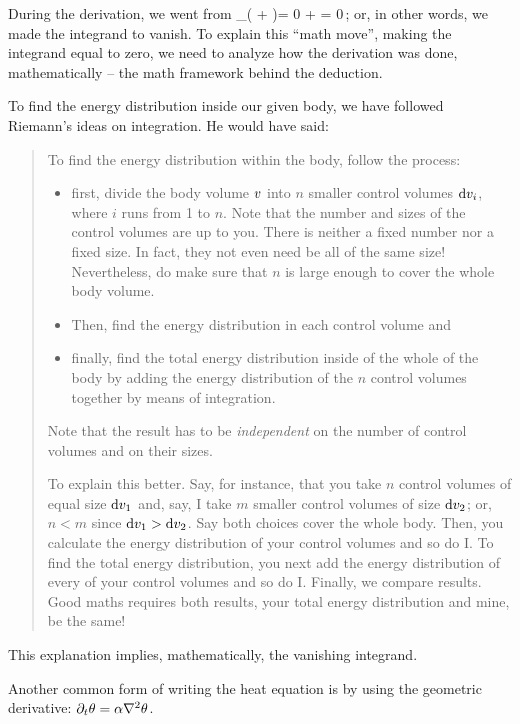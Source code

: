 \begin{mathnote}
During the derivation, we went from
\beq
\int_\vol \left( \rate\ien + \div\flux\then \right)\dx\vol = 0\qquad{}\qquad
\rate\ien + \div\flux\then = 0\,;
\eeq
or, in other words, we made the integrand to vanish. To explain this ``math move'', making the integrand equal to zero, we need to analyze how the derivation was done, mathematically -- the math framework behind the deduction. 

To find the energy distribution inside our given body, we have followed Riemann's ideas on integration. He would have said: 
\begin{quote}
To find the energy distribution within the body, follow the process:
\begin{itemize}
\item first, divide the body volume $v$ into $n$ smaller control volumes $\text{d}v_i$, where $i$ runs from 1 to $n$. Note that the number and sizes of the control volumes are up to you. There is neither a fixed number nor a fixed size. In fact, they not even need be all of the same size! Nevertheless, do make sure that $n$ is large enough to cover the whole body volume.
%
\item Then, find the energy distribution in each control volume and
%
\item finally, find the total energy distribution inside of the whole of the body by adding the energy distribution of the $n$ control volumes together by means of integration.
\end{itemize}
Note that the result has to be \emph{independent} on the number of control volumes and on their sizes. 

To explain this better. Say, for instance, that you take $n$ control volumes of equal size $\text{d}v_1$ and, say, I take $m$ smaller control volumes of size $\text{d}v_2$; or, $n < m$ since $\text{d}v_1 > \text{d}v_2$. Say both choices cover the whole body. Then, you calculate the energy distribution of your control volumes and so do I. To find the total energy distribution, you next add the energy distribution of every of your control volumes and so do I. Finally, we compare results. Good maths requires both results, your total energy distribution and mine, be the same!
\end{quote}
This explanation implies, mathematically, the vanishing integrand.
\end{mathnote}

\begin{notation}
Another common form of writing the heat equation is by using the geometric derivative: $\partial_{t}\theta = \alpha\nabla^2\theta$.
\end{notation}

